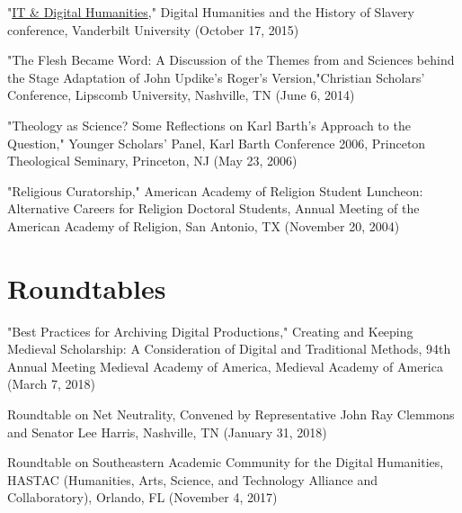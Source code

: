 \documentclass[10pt]{res} %
\begin{document}
\begin{resume}
\begin{hangparas}{.25in}{1}"\href{https://my.vanderbilt.edu/digitalhumanities/files/2015/10/Digital-Humanities-and-the-History-of-Slavery-3.jpg}{IT \& Digital Humanities}," Digital Humanities and the History of Slavery conference, Vanderbilt University (October 17, 2015)\end{hangparas}

\begin{hangparas}{.25in}{1}"The Flesh Became Word: A Discussion of the Themes from and Sciences behind the Stage Adaptation of John Updike’s Roger’s Version,"Christian Scholars’ Conference, Lipscomb University, Nashville, TN (June 6, 2014)\end{hangparas}

\begin{hangparas}{.25in}{1}"Theology as Science? Some Reflections on Karl Barth’s Approach to the Question," Younger Scholars’ Panel, Karl Barth Conference 2006, Princeton Theological Seminary, Princeton, NJ (May 23, 2006)\end{hangparas}

\begin{hangparas}{.25in}{1}"Religious Curatorship," American Academy of Religion Student Luncheon: Alternative Careers for Religion Doctoral Students, Annual Meeting of the American Academy of Religion, San Antonio, TX (November 20, 2004)\end{hangparas}

\section{Roundtables}

\begin{hangparas}{.25in}{1}"Best Practices for Archiving Digital Productions," Creating and Keeping Medieval Scholarship: A Consideration of Digital and Traditional Methods, 94th Annual Meeting Medieval Academy of America, Medieval Academy of America (March 7, 2018)\end{hangparas}

\begin{hangparas}{.25in}{1}Roundtable on Net Neutrality, Convened by Representative John Ray Clemmons and Senator Lee Harris, Nashville, TN (January 31, 2018)\end{hangparas}

\begin{hangparas}{.25in}{1}Roundtable on Southeastern Academic Community for the Digital Humanities, HASTAC (Humanities, Arts, Science, and Technology Alliance and Collaboratory), Orlando, FL (November 4, 2017)\end{hangparas}


\end{resume}
\end{document}
